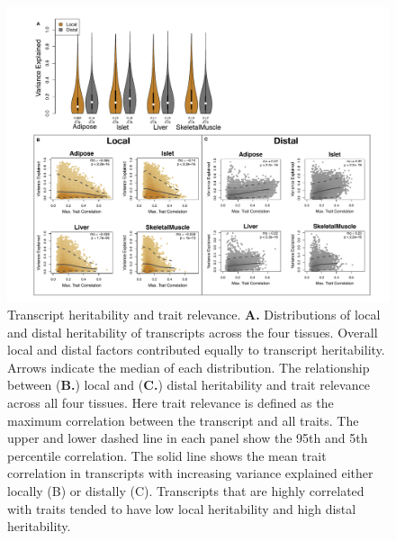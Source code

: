 \documentclass[
]{article}
\begin{document}
\begin{figure}[ht!]
\includegraphics[width=\textwidth]{Figures/Fig2_motivation.pdf} 
\caption{Transcript heritability and trait relevance. 
\textbf{A.} Distributions of local and distal heritability 
of transcripts across the four tissues. Overall local and 
distal factors contributed equally to transcript heritability. 
Arrows indicate the median of each distribution. The 
relationship between (\textbf{B.}) local and (\textbf{C.}) 
distal heritability and trait relevance across all four 
tissues. Here trait relevance is defined as the maximum 
correlation between the transcript and all traits. The upper 
and lower dashed line in each panel show the 95th and 5th 
percentile correlation. The solid line shows the mean trait 
correlation in transcripts with increasing variance explained 
either locally (B) or distally (C). Transcripts that are highly 
correlated with traits tended to have low local heritability and 
high distal heritability.}
\label{fig:motivation}
\end{figure}
\end{document}
